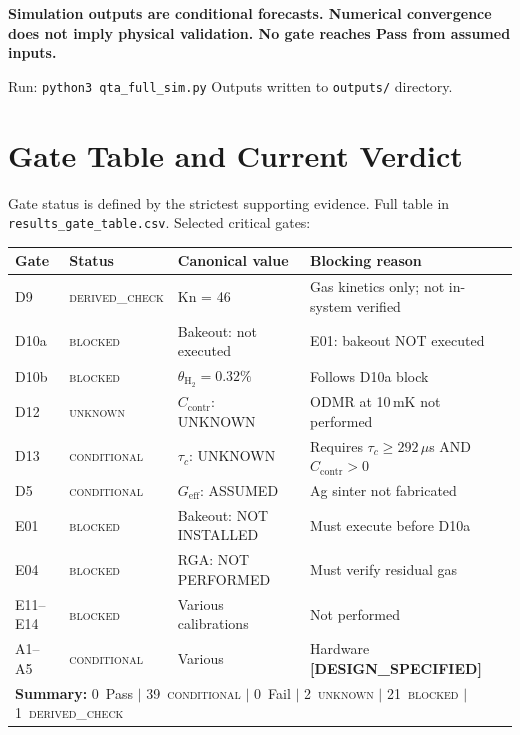 \documentclass[12pt,a4paper]{article}
\newcommand{\blocked}{\textsc{blocked}}
\newcommand{\conditional}{\textsc{conditional}}
\newcommand{\derivedcheck}{\textsc{derived\_check}}
\newcommand{\unknown}{\textsc{unknown}}
\newcommand{\designspec}{\textbf{[DESIGN\_SPECIFIED]}}
\begin{document}
\textbf{Simulation outputs are conditional forecasts.
Numerical convergence does not imply physical validation.
No gate reaches Pass from assumed inputs.}

Run: \verb|python3 qta_full_sim.py|
Outputs written to \verb|outputs/| directory.

\section{Gate Table and Current Verdict}
\label{sec:gates}

Gate status is defined by the strictest supporting evidence.
Full table in \texttt{results\_gate\_table.csv}.
Selected critical gates:

\begin{center}
\small
\begin{longtable}{lllp{6cm}}
\toprule
Gate & Status & Canonical value & Blocking reason \\
\midrule
D9 & \derivedcheck{} & Kn = 46 & Gas kinetics only; not in-system verified \\
D10a & \blocked{} & Bakeout: not executed & E01: bakeout NOT executed \\
D10b & \blocked{} & $\theta_\mathrm{H_2}=0.32\%$ & Follows D10a block \\
D12 & \unknown{} & $C_\mathrm{contr}$: UNKNOWN & ODMR at 10\,mK not performed \\
D13 & \conditional{} & $\tau_c$: UNKNOWN & Requires $\tau_c\geq292\,\mu$s AND $C_\mathrm{contr}>0$ \\
D5 & \conditional{} & $G_\mathrm{eff}$: ASSUMED & Ag sinter not fabricated \\
E01 & \blocked{} & Bakeout: NOT INSTALLED & Must execute before D10a \\
E04 & \blocked{} & RGA: NOT PERFORMED & Must verify residual gas \\
E11--E14 & \blocked{} & Various calibrations & Not performed \\
A1--A5 & \conditional{} & Various & Hardware \designspec{} \\
\midrule
\multicolumn{4}{l}{\textbf{Summary:} 0~Pass $|$ 39~\conditional{} $|$ 0~Fail
$|$ 2~\unknown{} $|$ 21~\blocked{} $|$ 1~\derivedcheck{}} \\
\bottomrule
\end{longtable}
\end{center}
\end{document}
